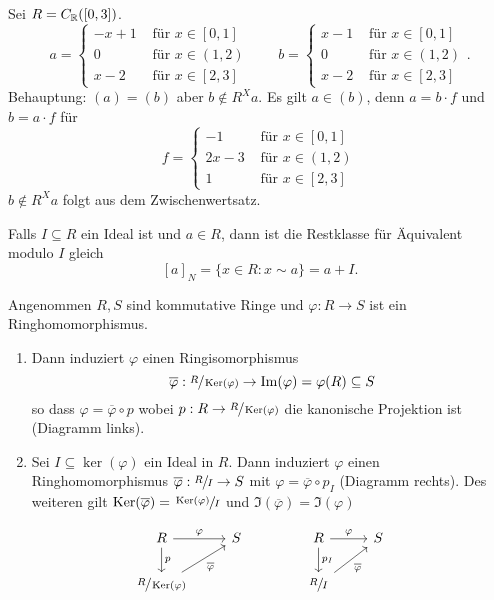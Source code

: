 \begin{eg}
	Sei $R = C_{\mathbb{R}}([0,3])$.
	\[
	a = \begin{cases}
		-x+1 &\text{ für } x \in [0,1]\\
		0 &\text{ für } x \in (1,2)\\
		x-2 &\text{ für } x \in [2,3]
	\end{cases} \qquad b = \begin{cases}
		x-1 &\text{ für } x \in [0,1]\\
		0 &\text{ für } x \in (1,2)\\
		x-2 &\text{ für } x \in [2,3]
	\end{cases}
	.\] 
	Behauptung: $(a) = (b)$ aber $b \not\in R^{X} a$.
	Es gilt $a \in (b)$, denn $a = b  \cdot f$ und $b = a \cdot f$ für
	\[
	f = \begin{cases}
		
		-1 &\text{ für } x \in [0,1]\\
		2x-3 &\text{ für } x \in (1,2)\\
		1 &\text{ für } x \in [2,3]
	\end{cases}
\]
	$b \not\in R^{X} a$ folgt aus dem Zwischenwertsatz.
\end{eg}

Falls $I \subseteq R$ ein Ideal ist und $a \in R$, dann ist die Restklasse für Äquivalent modulo $I$ gleich
\[
	[a]_{N} = \{x \in R: x \sim a\} = a + I
.\] 

\begin{theorem}
	Angenommen $R,S$ sind kommutative Ringe und $\varphi: R  \to S$ ist ein Ringhomomorphismus.
	\begin{enumerate}
		\item Dann induziert $\varphi$ einen Ringisomorphismus
			\[
				\overline{\varphi}: \sfrac{R}{\operatorname{Ker}(\varphi)} \to \Im(\varphi) = \varphi(R) \subseteq S
			\] 
			so dass $\varphi = \overline{\varphi} \circ p$ wobei $p : R \to \sfrac{R}{\operatorname{Ker}(\varphi)}$ die kanonische Projektion ist (Diagramm links).
		\item Sei $I \subseteq \ker(\varphi)$ ein Ideal in $R$.
			Dann induziert $\varphi$ einen Ringhomomorphismus $\overline{\varphi}: \sfrac{R}{I} \to S$ mit $\varphi = \overline{\varphi} \circ p_{I}$ (Diagramm rechts).
			Des weiteren gilt $\operatorname{Ker}(\overline{\varphi}) = \sfrac{\operatorname{Ker}(\varphi)}{I}$ und $\Im(\overline{\varphi}) = \Im(\varphi)$
	\end{enumerate}
	\[
	\begin{tikzcd}
		R \arrow[d, "p"] \arrow[r, "\varphi"]                      & S \\
		\sfrac{R}{\ker(\varphi)} \arrow[ru, "\overline{\varphi}"'] &  
	\end{tikzcd}\qquad\qquad
	\begin{tikzcd}
		R \arrow[d, "p_{I}"] \arrow[r, "\varphi"]      & S \\
		\sfrac{R}{I} \arrow[ru, "\overline{\varphi}"'] &  
	\end{tikzcd}
	\]
\end{theorem}

